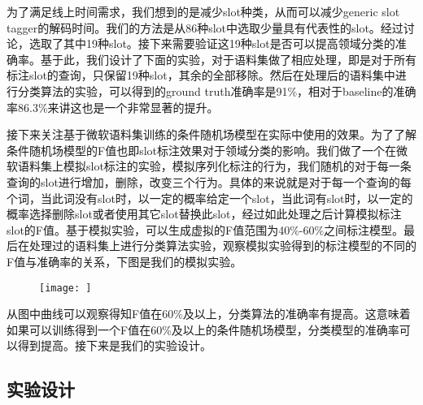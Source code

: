 \documentclass[master]{njuthesis}
\begin{document}
    为了满足线上时间需求，我们想到的是减少slot种类，从而可以减少generic slot tagger的解码时间。我们的方法是从86种slot中选取少量具有代表性的slot。经过讨论，选取了其中19种slot。接下来需要验证这19种slot是否可以提高领域分类的准确率。基于此，我们设计了下面的实验，对于语料集做了相应处理，即是对于所有标注slot的查询，只保留19种slot，其余的全部移除。然后在处理后的语料集中进行分类算法的实验，可以得到的ground truth准确率是91\%，相对于baseline的准确率86.3\%来讲这也是一个非常显著的提升。
    
    接下来关注基于微软语料集训练的条件随机场模型在实际中使用的效果。为了了解条件随机场模型的F值也即slot标注效果对于领域分类的影响。我们做了一个在微软语料集上模拟slot标注的实验，模拟序列化标注的行为，我们随机的对于每一条查询的slot进行增加，删除，改变三个行为。具体的来说就是对于每一个查询的每个词，当此词没有slot时，以一定的概率给定一个slot，当此词有slot时，以一定的概率选择删除slot或者使用其它slot替换此slot，经过如此处理之后计算模拟标注slot的F值。基于模拟实验，可以生成虚拟的F值范围为40\%-60\%之间标注模型。最后在处理过的语料集上进行分类算法实验，观察模拟实验得到的标注模型的不同的F值与准确率的关系，下图是我们的模拟实验。
    \begin{figure}[htbp]
      \centering
      \texttt{[image: ]}
      \caption{}\label{fig:test1}
    \end{figure}

    
    从图中曲线可以观察得知F值在60\%及以上，分类算法的准确率有提高。这意味着如果可以训练得到一个F值在60\%及以上的条件随机场模型，分类模型的准确率可以得到提高。接下来是我们的实验设计。

\subsection{实验设计}
\end{document}
